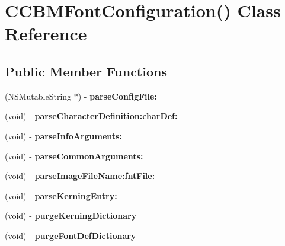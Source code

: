 \hypertarget{interface_c_c_b_m_font_configuration_07_08}{\section{C\-C\-B\-M\-Font\-Configuration() Class Reference}
\label{interface_c_c_b_m_font_configuration_07_08}
}
\subsection*{Public Member Functions}
\begin{DoxyCompactItemize}
\item 
\hypertarget{interface_c_c_b_m_font_configuration_07_08_a4e8303b1e1898f5c9a15168a8e232607}{(N\-S\-Mutable\-String $\ast$) -\/ {\bfseries parse\-Config\-File\-:}}\label{interface_c_c_b_m_font_configuration_07_08_a4e8303b1e1898f5c9a15168a8e232607}

\item 
\hypertarget{interface_c_c_b_m_font_configuration_07_08_a639bbe6a94019fc7f4920bb3fd317fab}{(void) -\/ {\bfseries parse\-Character\-Definition\-:char\-Def\-:}}\label{interface_c_c_b_m_font_configuration_07_08_a639bbe6a94019fc7f4920bb3fd317fab}

\item 
\hypertarget{interface_c_c_b_m_font_configuration_07_08_a43f2d7418d72bbf8d556a06cf091ae34}{(void) -\/ {\bfseries parse\-Info\-Arguments\-:}}\label{interface_c_c_b_m_font_configuration_07_08_a43f2d7418d72bbf8d556a06cf091ae34}

\item 
\hypertarget{interface_c_c_b_m_font_configuration_07_08_a8a6e042f80de8485580d7a519754769f}{(void) -\/ {\bfseries parse\-Common\-Arguments\-:}}\label{interface_c_c_b_m_font_configuration_07_08_a8a6e042f80de8485580d7a519754769f}

\item 
\hypertarget{interface_c_c_b_m_font_configuration_07_08_ab5a78dbc1791d20377f54ac1280e223f}{(void) -\/ {\bfseries parse\-Image\-File\-Name\-:fnt\-File\-:}}\label{interface_c_c_b_m_font_configuration_07_08_ab5a78dbc1791d20377f54ac1280e223f}

\item 
\hypertarget{interface_c_c_b_m_font_configuration_07_08_addd88984c79de33f8763686996bede7d}{(void) -\/ {\bfseries parse\-Kerning\-Entry\-:}}\label{interface_c_c_b_m_font_configuration_07_08_addd88984c79de33f8763686996bede7d}

\item 
\hypertarget{interface_c_c_b_m_font_configuration_07_08_a3be3d8694106d234201e0ce2fb1f3190}{(void) -\/ {\bfseries purge\-Kerning\-Dictionary}}\label{interface_c_c_b_m_font_configuration_07_08_a3be3d8694106d234201e0ce2fb1f3190}

\item 
\hypertarget{interface_c_c_b_m_font_configuration_07_08_a4fa9094762ee1e84521c253819c89613}{(void) -\/ {\bfseries purge\-Font\-Def\-Dictionary}}\label{interface_c_c_b_m_font_configuration_07_08_a4fa9094762ee1e84521c253819c89613}

\end{DoxyCompactItemize}


